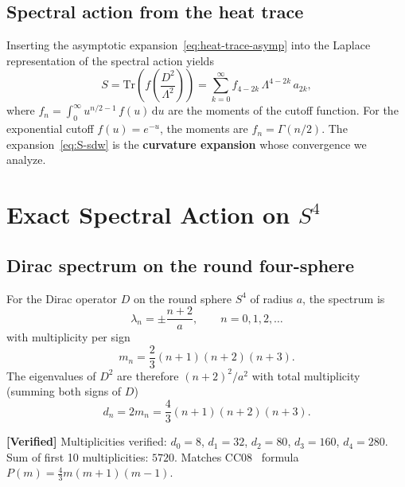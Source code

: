 \documentclass[11pt,a4paper]{article}
\renewcommand{\dd}{\mathrm{d}}
\newcommand{\Lam}{\Lambda}
\theoremstyle{plain}
\theoremstyle{definition}
\newcommand{\verified}[1]{%
  \par\smallskip\noindent
  \colorbox{green!10}{\parbox{\dimexpr\linewidth-2\fboxsep}{%
    \textcolor{green!50!black}{\textbf{[Verified]}} #1}}%
  \par\smallskip}
\begin{document}
\subsection{Spectral action from the heat trace}

Inserting the asymptotic expansion~\eqref{eq:heat-trace-asymp} into the
Laplace representation of the spectral action yields
\begin{equation}\label{eq:S-sdw}
  S = \mathrm{Tr}\!\left(f\!\left(\frac{D^2}{\Lam^2}\right)\right)
  = \sum_{k=0}^{\infty} f_{4-2k}\,\Lam^{4-2k}\,a_{2k},
\end{equation}
where $f_n = \int_0^\infty u^{n/2-1}\,f(u)\,\dd u$ are the moments of the
cutoff function.  For the exponential cutoff $f(u) = e^{-u}$, the moments are
$f_n = \Gamma(n/2)$.  The expansion~\eqref{eq:S-sdw} is the
\textbf{curvature expansion} whose convergence we analyze.


\section{Exact Spectral Action on \texorpdfstring{$S^4$}{S4}}\label{sec:exact}

\subsection{Dirac spectrum on the round four-sphere}

For the Dirac operator $D$ on the round sphere $S^4$ of radius $a$, the
spectrum is~\cite{B96,F00}
\begin{equation}\label{eq:dirac-spectrum}
  \lambda_n = \pm\frac{n+2}{a}, \qquad n = 0,1,2,\ldots
\end{equation}
with multiplicity per sign
\begin{equation}\label{eq:dirac-mult}
  m_n = \frac{2}{3}(n+1)(n+2)(n+3).
\end{equation}
The eigenvalues of $D^2$ are therefore $(n+2)^2/a^2$ with total multiplicity
(summing both signs of $D$)
\begin{equation}\label{eq:d2-mult}
  d_n = 2m_n = \frac{4}{3}(n+1)(n+2)(n+3).
\end{equation}

\verified{Multiplicities verified: $d_0 = 8$, $d_1 = 32$, $d_2 = 80$,
$d_3 = 160$, $d_4 = 280$. Sum of first 10 multiplicities: $5720$.
Matches CC08~\cite{CC08} formula $P(m) = \tfrac{4}{3}m(m+1)(m-1)$.}
\end{document}
